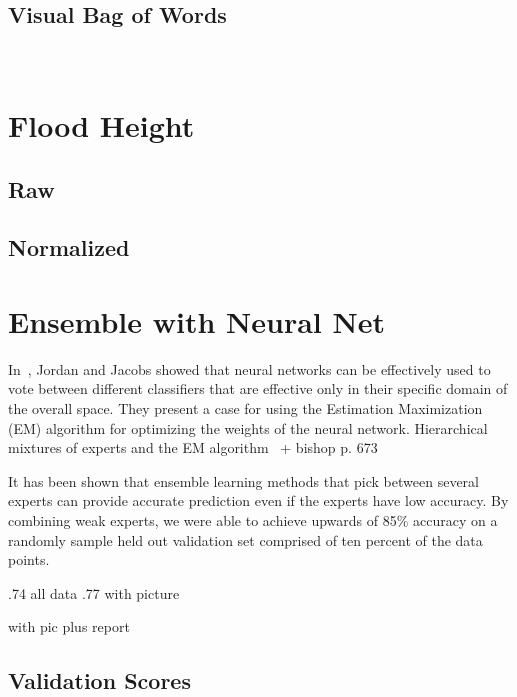 
\subsection{Visual Bag of Words}
~\cite{yangEvaluatingBagofvisualwordsRepresentations2007}

\section{Flood Height}
\subsection{Raw}
\subsection{Normalized}
\section{Ensemble with Neural Net}
In~\cite{jordanHierarchicalMixturesExperts1994}, Jordan and Jacobs showed that
neural networks can be effectively used to vote between different classifiers
that are effective only in their specific domain of the overall space. They present a
case for using the Estimation Maximization (EM) algorithm for optimizing the
weights of the neural network.
Hierarchical mixtures of experts and the EM
algorithm~\cite{jordanHierarchicalMixturesExperts1994}
+ bishop p. 673~\cite{bishopPatternRecognitionMachine2006}

It has been shown that ensemble learning methods that pick between several
experts can provide accurate prediction even if the experts have low accuracy.
By combining weak experts, we were able to achieve upwards of 85\% accuracy on a
randomly sample held out validation set comprised of ten percent of the data
points.


.74 all data 
.77 with picture
 
 with pic plus report 

\subsection{Validation Scores}
